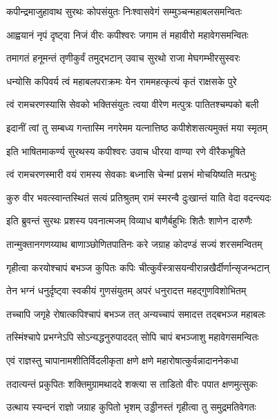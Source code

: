 \twolineshloka
{कपीन्द्रमाजुहावाथ सुरथः कोपसंयुतः}
{निःश्वासवेगं सम्मुञ्चन्महाबलसमन्वितः}%

\twolineshloka
{आह्वयानं नृपं दृष्ट्वा निजं वीरः कपीश्वरः}
{जगाम तं महावीरो महावेगसमन्वितः}%

\twolineshloka
{तमागतं हनूमन्तं तृणीकुर्वं तमुद्भटान्}
{उवाच सुरथो राजा मेघगम्भीरसुस्वरः}%


\twolineshloka
{धन्योसि कपिवर्य त्वं महाबलपराक्रमः}
{येन राममहत्कृत्यं कृतं राक्षसके पुरे}%

\twolineshloka
{त्वं रामचरणस्यासि सेवको भक्तिसंयुतः}
{त्वया वीरेण मत्पुत्रः पातितश्चम्पको बली}%

\twolineshloka
{इदानीं त्वां तु सम्बध्य गन्तास्मि नगरेमम}
{यत्नात्तिष्ठ कपीशेशसत्यमुक्तं मया स्मृतम्}%

\twolineshloka
{इति भाषितमाकर्ण्य सुरथस्य कपीश्वरः}
{उवाच धीरया वाण्या रणे वीरैकभूषिते}%


\twolineshloka
{त्वं रामचरणस्मारी वयं रामस्य सेवकाः}
{बध्नासि चेन्मां प्रसभं मोचयिष्यति मत्प्रभुः}%

\twolineshloka
{कुरु वीर भवत्स्वान्तस्थितं सत्यं प्रतिश्रुतम्}
{रामं स्मरन्वै दुःखान्तं याति वेदा वदन्त्यदः}%


\twolineshloka
{इति ब्रुवन्तं सुरथः प्रशस्य पवनात्मजम्}
{विव्याध बाणैर्बहुभिः शितैः शाणेन दारुणैः}%

\twolineshloka
{तान्मुक्तानगणय्याथ बाणाञ्छोणितपातिनः}
{करे जग्राह कोदण्डं सज्यं शरसमन्वितम्}%

\twolineshloka
{गृहीत्वा करयोश्चापं बभञ्ज कुपितः कपिः}
{चीत्कुर्वंस्त्रासयन्वीरान्नखैर्दीर्णान्सृजन्भटान्}%

\twolineshloka
{तेन भग्नं धनुर्दृष्ट्वा स्वकीयं गुणसंयुतम्}
{अपरं धनुरादत्त महद्गुणविशोभितम्}%

\twolineshloka
{तच्चापि जगृहे रोषात्कपिश्चापं बभञ्ज तत्}
{अन्यच्चापं समादत्त तद्बभञ्ज महाबलः}%

\twolineshloka
{तस्मिंश्चापे प्रभग्नेऽपि सोऽन्यद्धनुरुपाददत्}
{सोपि चापं बभञ्जाशु महावेगसमन्वितः}%

\twolineshloka
{एवं राज्ञस्तु चापानामशीतिर्विदलीकृता}
{क्षणे क्षणे महारोषात्कुर्वन्नादाननेकधा}%

\twolineshloka
{तदात्यन्तं प्रकुपितः शक्तिमुग्रामथाददे}
{शक्त्या स ताडितो वीरः पपात क्षणमुत्सुकः}%

\twolineshloka
{उत्थाय स्यन्दनं राज्ञो जग्राह कुपितो भृशम्}
{उड्डीनस्तं गृहीत्वा तु समुद्रमतिवेगतः}%

